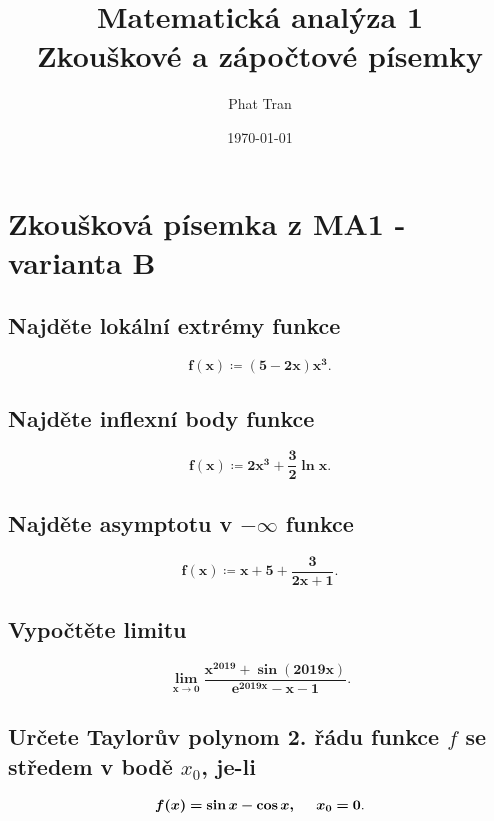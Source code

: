 \documentclass[12pt]{article}
\title{\Huge{\textbf{Matematická analýza 1}} \\ \huge{Zkouškové a zápočtové písemky}}
\author{Phat Tran}
\date{\today}
\begin{document}
\maketitle
\thispagestyle{empty}
\pagestyle{mycustomstyle}
\setcounter{page}{0}
\clearpage

\section{Zkoušková písemka z MA1 - varianta B}
    \subsection{\textnormal{Najděte lokální extrémy funkce}}
    \begin{tcolorbox}
        $$ \bm{ f(x) \coloneq (5 - 2x)x^{3} } . $$
    \end{tcolorbox}
        
        \clearpage

    \subsection{\textnormal{Najděte inflexní body funkce}}
    \begin{tcolorbox}
        $$ \bm{ f(x) \coloneq 2x^{3} + \frac{3}{2}\ln{x} } . $$
    \end{tcolorbox}
        
        \clearpage

    \subsection{\textnormal{Najděte asymptotu v $-\infty$ funkce}}
    \begin{tcolorbox}
        $$ \bm{ f(x) \coloneq x + 5 + \frac{3}{2x + 1} } . $$
    \end{tcolorbox}
        
        \clearpage

    \subsection{\textnormal{Vypočtěte limitu}}
    \begin{tcolorbox}
        $$ \bm{ \lim_{x \rightarrow 0} 
        \frac{x^{2019} + \sin{(2019x)}}{e^{2019x} - x - 1} } . $$ 
    \end{tcolorbox}
            
        \clearpage

    \subsection{\textnormal{
        Určete Taylorův polynom 2. řádu 
        funkce $f$ se středem v bodě $x_{0}$, je-li
    }}
    \begin{tcolorbox}
        $$ \bm{f(x) = \sin{x} - \cos{x}, \textnormal{\hspace*{0.5cm}} x_{0} = 0} . $$
    \end{tcolorbox}
        
        \pagebreak
\end{document}
